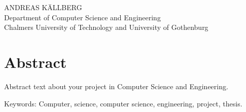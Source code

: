 \oneLineTitle\\
\oneLineSubtitle\\
ANDREAS KÄLLBERG\\
Department of Computer Science and Engineering\\
Chalmers University of Technology and University of Gothenburg

\thispagestyle{plain}			%
\section*{Abstract}
Abstract text about your project in  Computer Science and Engineering.

\vfill
Keywords: Computer, science, computer science, engineering, project, thesis.

\newpage				%
\thispagestyle{empty}
\mbox{}
